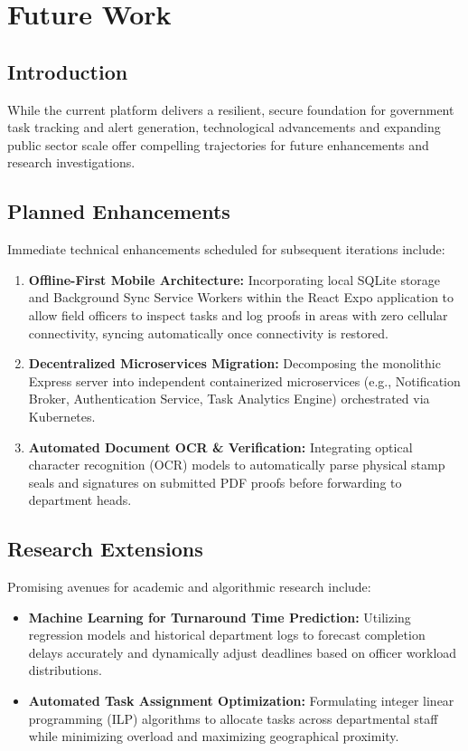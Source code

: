 \chapter{Future Work}
\label{ch:future_work}

\section{Introduction}
\label{sec:fw_intro}
While the current platform delivers a resilient, secure foundation for government task tracking and alert generation, technological advancements and expanding public sector scale offer compelling trajectories for future enhancements and research investigations.

\section{Planned Enhancements}
\label{sec:planned_enhancements}
Immediate technical enhancements scheduled for subsequent iterations include:
\begin{enumerate}
    \item \textbf{Offline-First Mobile Architecture:} Incorporating local SQLite storage and Background Sync Service Workers within the React Expo application to allow field officers to inspect tasks and log proofs in areas with zero cellular connectivity, syncing automatically once connectivity is restored.
    \item \textbf{Decentralized Microservices Migration:} Decomposing the monolithic Express server into independent containerized microservices (e.g., Notification Broker, Authentication Service, Task Analytics Engine) orchestrated via Kubernetes.
    \item \textbf{Automated Document OCR \& Verification:} Integrating optical character recognition (OCR) models to automatically parse physical stamp seals and signatures on submitted PDF proofs before forwarding to department heads.
\end{enumerate}

\section{Research Extensions}
\label{sec:research_extensions}
Promising avenues for academic and algorithmic research include:
\begin{itemize}
    \item \textbf{Machine Learning for Turnaround Time Prediction:} Utilizing regression models and historical department logs to forecast completion delays accurately and dynamically adjust deadlines based on officer workload distributions.
    \item \textbf{Automated Task Assignment Optimization:} Formulating integer linear programming (ILP) algorithms to allocate tasks across departmental staff while minimizing overload and maximizing geographical proximity.
\end{itemize}

